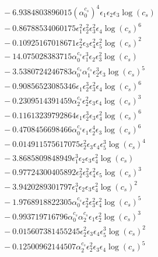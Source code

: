 \documentclass[10pt]{article}
\begin{document}
\begin{align*}
&{}  - 6.9384803896015 \left(\alpha_{0}^{c_s}\right)^{4} \epsilon_{1} \epsilon_{2} \epsilon_{3} \log{\left(c_{s} \right)} \\
&{}  - 0.86788534060175 \epsilon_{1}^{2} \epsilon_{2}^{2} \epsilon_{3}^{2} \epsilon_{4} \log{\left(c_{s} \right)}^{6} \\
&{}  - 0.10925167018671 \epsilon_{2}^{2} \epsilon_{3} \epsilon_{4}^{2} \epsilon_{5}^{2} \log{\left(c_{s} \right)}^{2} \\
&{}  - 14.075028383715 \alpha_{0}^{c_s} \epsilon_{1}^{3} \epsilon_{2} \epsilon_{3}^{2} \log{\left(c_{s} \right)} \\
&{}  - 3.5380724246783 \alpha_{0}^{c_s} \alpha_{1}^{c_s} \epsilon_{2}^{3} \epsilon_{3} \log{\left(c_{s} \right)}^{5} \\
&{}  - 0.90856523085346 \epsilon_{1} \epsilon_{2}^{3} \epsilon_{3}^{2} \epsilon_{4} \log{\left(c_{s} \right)}^{6} \\
&{}  - 0.2309514391459 \alpha_{2}^{c_s} \epsilon_{2}^{2} \epsilon_{3} \epsilon_{4} \log{\left(c_{s} \right)}^{3} \\
&{}  - 0.11613239792864 \epsilon_{1} \epsilon_{2}^{3} \epsilon_{3} \epsilon_{4}^{2} \log{\left(c_{s} \right)}^{6} \\
&{}  - 0.4708456698466 \alpha_{0}^{c_s} \epsilon_{1} \epsilon_{2}^{4} \epsilon_{3} \log{\left(c_{s} \right)}^{6} \\
&{}  - 0.014911575617075 \epsilon_{2}^{2} \epsilon_{3} \epsilon_{4} \epsilon_{5}^{3} \log{\left(c_{s} \right)}^{4} \\
&{}  - 3.8685809848949 \epsilon_{1}^{3} \epsilon_{2} \epsilon_{3} \epsilon_{4}^{2} \log{\left(c_{s} \right)} \\
&{}  - 0.97724300405892 \epsilon_{2}^{2} \epsilon_{3}^{2} \epsilon_{4}^{2} \epsilon_{5} \log{\left(c_{s} \right)}^{3} \\
&{}  - 3.9420289301797 \epsilon_{1}^{3} \epsilon_{2} \epsilon_{3} \epsilon_{4}^{2} \log{\left(c_{s} \right)}^{2} \\
&{}  - 1.9768918822305 \alpha_{0}^{c_s} \epsilon_{2}^{2} \epsilon_{3}^{2} \epsilon_{4}^{2} \log{\left(c_{s} \right)}^{5} \\
&{}  - 0.993719716796 \alpha_{0}^{c_s} \alpha_{2}^{c_s} \epsilon_{1} \epsilon_{2}^{2} \log{\left(c_{s} \right)}^{3} \\
&{}  - 0.015607381455245 \epsilon_{2}^{2} \epsilon_{3} \epsilon_{4} \epsilon_{5}^{3} \log{\left(c_{s} \right)}^{2} \\
&{}  - 0.12500962144507 \alpha_{2}^{c_s} \epsilon_{2}^{2} \epsilon_{3} \epsilon_{4} \log{\left(c_{s} \right)}^{5} \\

\end{align*}
\end{document}
